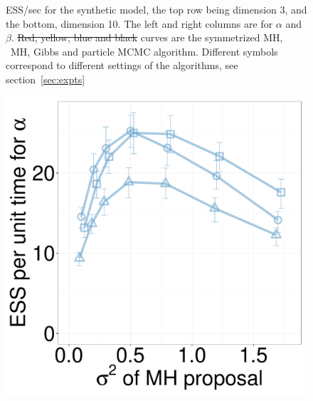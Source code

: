\begin{figure}[H]
\begin{minipage}[hp]{0.24\linewidth}
	\end{minipage}
    \caption{ESS/sec for the synthetic  model, the top row being dimension 3, and the bottom, dimension 10. The left and right columns are for $\alpha$ and $\beta$. \sout{Red, yellow, blue and black}  curves are the symmetrized MH, \naive\ MH, Gibbs and particle MCMC algorithm. Different symbols correspond to different settings of the algorithms, see section~\ref{sec:expts}}
     \label{fig:ESS_EXP_D10}
  \end{figure}

  \begin{figure}[H]
  \centering
  \begin{minipage}[!hp]{0.24\linewidth}
  \centering
    \includegraphics [width=0.99\textwidth, angle=0]{figs/new_whole_exp_figs/mh_exp_alpha_dim3.pdf}
\end{minipage}
  \begin{minipage}[hp]{0.24\linewidth}
  \centering

\end{minipage}
\end{figure}
